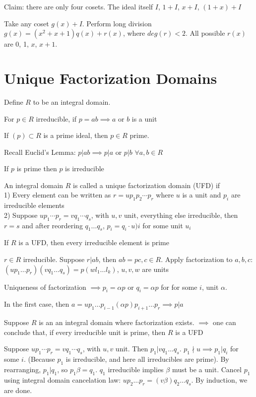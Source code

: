 \documentclass[10pt]{article}
\begin{document}
Claim: there are only four cosets. The ideal itself $I$, $1 + I$, $x + I$, $(1 + x) + I$

Take any coset $g(x) + I$. Perform long division $g(x) = (x^2 + x + 1)q(x) + r(x)$, where $deg(r) < 2$. All possible $r(x)$ are 0, 1, $x$, $x + 1$.

\section{Unique Factorization Domains}
Define $R$ to be an integral domain. 
\begin{defn}
    For $p \in R$ irreducible, if $p = ab \implies a$ or $b$ is a unit
\end{defn}

\begin{defn}
    If $(p) \subset R$ is a prime ideal, then $p\in R$ prime.
\end{defn}
Recall Euclid's Lemma: $p | ab \implies p | a$ or $p | b$ $\forall a, b \in R$

\begin{rmk}
    If $p$ is prime then $p$ is irreducible
\end{rmk}

\begin{defn}
    An integral domain $R$ is called a unique factorization domain (UFD) if\\
    1) Every element can be written as $r = up_1p_2\cdots p_r$ where $u$ is a unit and $p_i$ are irreducible elements\\
    2) Suppose $up_1\cdots p_r = vq_1 \cdots q_s$, with $u, v$ unit, everything else irreducible, then $r = s$ and after reordering $q_1\ldots q_s$, $p_i = q_i \cdot u)i$ for some unit $u_i$
\end{defn}

\begin{rmk}
    If $R$ is a UFD, then every irreducible element is prime
\end{rmk}
$r \in R$ irreducible. Suppose $r | ab$, then $ab = pc, c\in R$. Apply factorization to $a, b, c$: $(u p_1\ldots p_r)(vq_1\ldots q_s) = p(wl_1 \ldots l_k)$, $u, v, w$ are units

Uniqueness of factorization $\implies p_i = \alpha p$ or $q_i = \alpha p$ for for some $i$, unit $\alpha$. 

In the first case, then $a = up_1 \ldots p_{i-1}(\alpha p)p_{i + 1}\ldots p_r \implies p | a$

\begin{rmk} %
    Suppose $R$ is an an integral domain where factorization exists. $\implies$ one can conclude that, if every irreducible unit is prime, then $R$ is a UFD
\end{rmk}
Suppose $up_1\cdots p_r = vq_1 \cdots q_s$, with $u, v$ unit. Then $p_1 | vq_1\ldots q_s$. $p_1 \nmid u \implies p_1 | q_i$ for some $i$. (Because $p_1$ is irreducible, and here all irreducibles are prime). By rearranging, $p_1 | q_1$, so $p_1 \beta = q_1$. $q_1$ irreducible implies $\beta$ must be a unit. Cancel $p_1$ using integral domain cancelation law: $up_2\ldots p_r = (v\beta)q_2\ldots q_s$. By induction, we are done.
\end{document}
